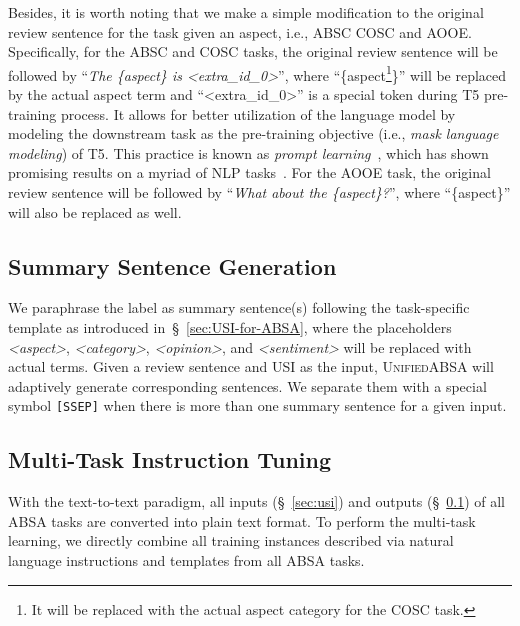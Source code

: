 \documentclass[11pt]{article}
\newcommand{\UnifiedABSA}{\textsc{UnifiedABSA}\xspace}
\newcommand{\USI}{\textsc{USI}\xspace}
\begin{document}
Besides, it is worth noting that we make a simple modification to the original review sentence for the task given an aspect, i.e., ABSC COSC and AOOE. Specifically, for the ABSC and COSC tasks, the original review sentence will be followed by ``\emph{The \{aspect\} is <extra\_id\_0>}'', where ``\{aspect\footnote{It will be replaced with the actual aspect category for the COSC task.}\}'' will be replaced by the actual aspect term and ``<extra\_id\_0>'' is a special token during T5 pre-training process. It allows for better utilization of the language model by modeling the downstream task as the pre-training objective (i.e., \emph{mask language modeling}) of T5. This practice is known as \emph{prompt learning}~\citep{liu2021prompt-survey}, which has shown promising results on a myriad of NLP tasks~\citep{schick-schutze-2021-few-shot-generation,schick-schutze-2021-just,gao-etal-2021lm-bff}. For the AOOE task, the original review sentence will be followed by ``\emph{What about the \{aspect\}?}'', where ``\{aspect\}'' will also be replaced as well.


\subsection{Summary Sentence Generation}
\label{sec:summary-sentence-generation}


We paraphrase the label as summary sentence(s) following the task-specific template as introduced in~\S~\ref{sec:USI-for-ABSA}, where the placeholders \emph{<aspect>}, \emph{<category>}, \emph{<opinion>}, and \emph{<sentiment>} will be replaced with actual terms. Given a review sentence  and \USI  as the input, \UnifiedABSA will adaptively generate corresponding sentences. We separate them with a special symbol \texttt{[SSEP]} when there is more than one summary sentence for a given input.


\subsection{Multi-Task Instruction Tuning}
\label{sec:multi-task-instuction-tuning}

With the text-to-text paradigm, all inputs (\S~\ref{sec:usi}) and outputs (\S~\ref{sec:summary-sentence-generation}) of all ABSA tasks are converted into plain text format. To perform the multi-task learning, we directly combine all training instances described via natural language instructions and templates from all ABSA tasks. 

\vspace{-0.1cm}
\end{document}
